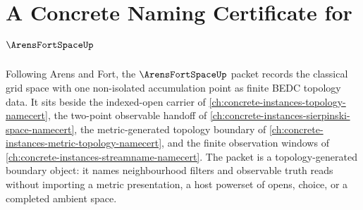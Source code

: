 \chapter{A Concrete Naming Certificate for $\ArensFortSpaceUp$}
\label{ch:concrete-instances-arens-fort-space-namecert}

Following Arens and Fort, the $\ArensFortSpaceUp$ packet records the classical grid space with one non-isolated accumulation point as finite BEDC topology data. It sits beside the indexed-open carrier of \autoref{ch:concrete-instances-topology-namecert}, the two-point observable handoff of \autoref{ch:concrete-instances-sierpinski-space-namecert}, the metric-generated topology boundary of \autoref{ch:concrete-instances-metric-topology-namecert}, and the finite observation windows of \autoref{ch:concrete-instances-streamname-namecert}. The packet is a topology-generated boundary object: it names neighbourhood filters and observable truth reads without importing a metric presentation, a host powerset of opens, choice, or a completed ambient space.

